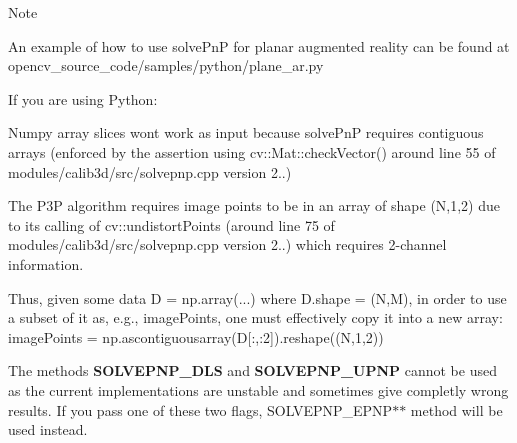 \begin{DoxyNote}{Note}

\begin{DoxyItemize}
\item An example of how to use solve\+PnP for planar augmented reality can be found at opencv\+\_\+source\+\_\+code/samples/python/plane\+\_\+ar.\+py
\item If you are using Python\+:
\begin{DoxyItemize}
\item Numpy array slices won\textquotesingle{}t work as input because solve\+PnP requires contiguous arrays (enforced by the assertion using cv\+::\+Mat\+::check\+Vector() around line 55 of modules/calib3d/src/solvepnp.\+cpp version 2..)
\item The P3P algorithm requires image points to be in an array of shape (N,1,2) due to its calling of cv\+::undistort\+Points (around line 75 of modules/calib3d/src/solvepnp.\+cpp version 2..) which requires 2-\/channel information.
\item Thus, given some data D = np.\+array(...) where D.\+shape = (N,M), in order to use a subset of it as, e.\+g., image\+Points, one must effectively copy it into a new array\+: image\+Points = np.\+ascontiguousarray(\+D\mbox{[}\+:,\+:2\mbox{]}).reshape((\+N,1,2))
\end{DoxyItemize}
\item The methods {\bfseries S\+O\+L\+V\+E\+P\+N\+P\+\_\+\+D\+LS} and {\bfseries S\+O\+L\+V\+E\+P\+N\+P\+\_\+\+U\+P\+NP} cannot be used as the current implementations are unstable and sometimes give completly wrong results. If you pass one of these two flags, S\+O\+L\+V\+E\+P\+N\+P\+\_\+\+E\+P\+N\+P$\ast$$\ast$ method will be used instead. 
\end{DoxyItemize}
\end{DoxyNote}
\mbox{\label{group__calib3d_ga87d56bc65d398f58897fa9bda35caef7}} 
